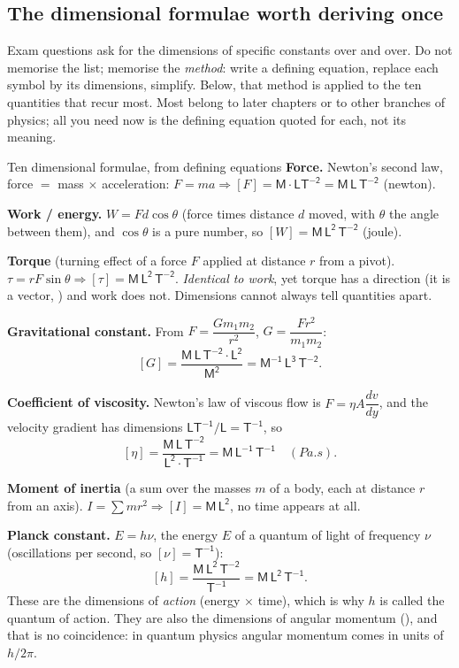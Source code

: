 \subsection{The dimensional formulae worth deriving once}\label{sec:dimformulae}

Exam questions ask for the dimensions of specific constants over and over. Do not memorise the list;
memorise the \emph{method}: write a defining equation, replace each symbol by its dimensions, simplify.
Below, that method is applied to the ten quantities that recur most. Most belong to later chapters or
to other branches of physics; all you need now is the defining equation quoted for each, not its
meaning.

\begin{derivbox}{Ten dimensional formulae, from defining equations}
 \textbf{Force.} Newton's second law, force $=$ mass $\times$ acceleration: $F=ma \Rightarrow [F]=\mathsf{M}\cdot\mathsf{LT^{-2}}
=\boxed{\mathsf{M\,L\,T^{-2}}}$ \;(newton).

 \textbf{Work / energy.} $W=Fd\cos\theta$ (force times distance $d$ moved, with $\theta$ the angle between them), and $\cos\theta$ is a pure number, so
$[W]=\boxed{\mathsf{M\,L^{2}\,T^{-2}}}$ \;(joule).

 \textbf{Torque} (turning effect of a force $F$ applied at distance $r$ from a pivot). $\tau=rF\sin\theta \Rightarrow [\tau]=\boxed{\mathsf{M\,L^{2}\,T^{-2}}}$.
\emph{Identical to work}, yet torque has a direction (it is a vector, ) and work does not. Dimensions cannot always tell
quantities apart.

 \textbf{Gravitational constant.} From $F=\dfrac{Gm_1m_2}{r^{2}}$, $G=\dfrac{Fr^{2}}{m_1m_2}$:
\[
[G]=\frac{\mathsf{M\,L\,T^{-2}}\cdot\mathsf{L^{2}}}{\mathsf{M^{2}}}
=\boxed{\mathsf{M^{-1}\,L^{3}\,T^{-2}}}.
\]

 \textbf{Coefficient of viscosity.} Newton's law of viscous flow is $F=\eta A\dfrac{dv}{dy}$, and
the velocity gradient has dimensions $\mathsf{LT^{-1}/L}=\mathsf{T^{-1}}$, so
\[
[\eta]=\frac{\mathsf{M\,L\,T^{-2}}}{\mathsf{L^{2}}\cdot\mathsf{T^{-1}}}
=\boxed{\mathsf{M\,L^{-1}\,T^{-1}}}\quad(\si{Pa.s}).
\]

 \textbf{Moment of inertia} (a sum over the masses $m$ of a body, each at distance $r$ from an axis). $I=\sum mr^{2}\Rightarrow[I]=\boxed{\mathsf{M\,L^{2}}}$, no time
appears at all.

 \textbf{Planck constant.} $E=h\nu$, the energy $E$ of a quantum of light of frequency $\nu$
(oscillations per second, so $[\nu]=\mathsf{T^{-1}}$):
\[
[h]=\frac{\mathsf{M\,L^{2}\,T^{-2}}}{\mathsf{T^{-1}}}=\boxed{\mathsf{M\,L^{2}\,T^{-1}}}.
\]
These are the dimensions of \emph{action} (energy $\times$ time), which is why $h$ is called the quantum
of action. They are also the dimensions of angular momentum (), and that is no
coincidence: in quantum physics angular momentum comes in units of $h/2\pi$.


\end{derivbox}
